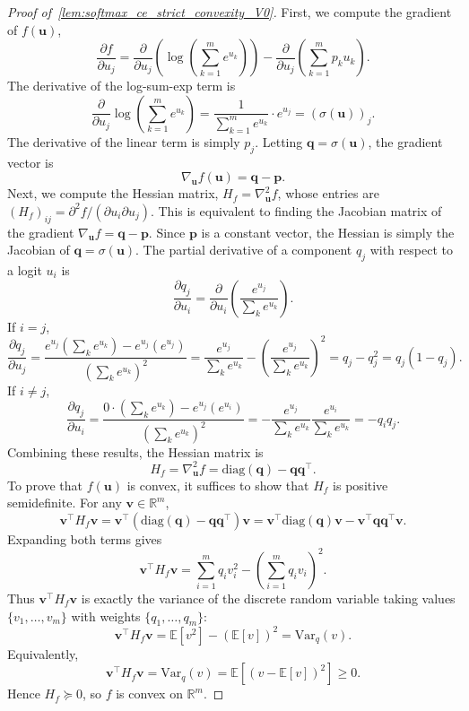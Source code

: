 \documentclass[11pt]{article}
\begin{document}
\begin{proof}[Proof of~\cref{lem:softmax_ce_strict_convexity_V0}]
First, we compute the gradient of \(f(\boldsymbol{u})\),
\[ \frac{\partial f}{\partial u_j} = \frac{\partial}{\partial u_j} \left( \log\left(\sum_{k=1}^m e^{u_k}\right) \right) - \frac{\partial}{\partial u_j} \left( \sum_{k=1}^m p_k u_k \right). \]
The derivative of the log-sum-exp term is
\[ \frac{\partial}{\partial u_j} \log\left(\sum_{k=1}^m e^{u_k}\right) = \frac{1}{\sum_{k=1}^m e^{u_k}} \cdot e^{u_j} = (\sigma(\boldsymbol{u}))_j. \]
The derivative of the linear term is simply \(p_j\).
Letting \(\boldsymbol{q} = \sigma(\boldsymbol{u})\), the gradient vector is
\[ \nabla_{\boldsymbol{u}} f(\boldsymbol{u}) = \boldsymbol{q} - \boldsymbol{p}. \]
Next, we compute the Hessian matrix, \(H_f = \nabla^2_{\boldsymbol{u}} f\), whose entries are \( (H_f)_{ij} = \partial^2 f/(\partial u_i \partial u_j) \). This is equivalent to finding the Jacobian matrix of the gradient \(\nabla_{\boldsymbol{u}} f = \boldsymbol{q} - \boldsymbol{p}\). Since \(\boldsymbol{p}\) is a constant vector, the Hessian is simply the Jacobian of \(\boldsymbol{q} = \sigma(\boldsymbol{u})\).
The partial derivative of a component \(q_j\) with respect to a logit \(u_i\) is
\[ \frac{\partial q_j}{\partial u_i} = \frac{\partial}{\partial u_i}\left( \frac{e^{u_j}}{\sum_k e^{u_k}} \right). \]
If \(i = j\),
    \[ \frac{\partial q_j}{\partial u_j} = \frac{e^{u_j}\left(\sum_k e^{u_k}\right) - e^{u_j}(e^{u_j})}{\left(\sum_k e^{u_k}\right)^2} = \frac{e^{u_j}}{\sum_k e^{u_k}} - \left(\frac{e^{u_j}}{\sum_k e^{u_k}}\right)^2 = q_j - q_j^2 = q_j(1-q_j). \]
If \(i \neq j\),
    \[ \frac{\partial q_j}{\partial u_i} = \frac{0 \cdot (\sum_k e^{u_k}) - e^{u_j}(e^{u_i})}{\left(\sum_k e^{u_k}\right)^2} = -\frac{e^{u_j}}{\sum_k e^{u_k}}\frac{e^{u_i}}{\sum_k e^{u_k}} = -q_i q_j. \]
Combining these results, the Hessian matrix is
\[ H_f = \nabla^2_{\boldsymbol{u}} f = \mathrm{diag}(\boldsymbol{q}) - \boldsymbol{q}\boldsymbol{q}^\top. \]
To prove that \(f(\boldsymbol{u})\) is convex, it suffices to show that \(H_f\) is positive semidefinite. For any \(\boldsymbol{v} \in \mathbb{R}^m\),
\[
\boldsymbol{v}^\top H_f \boldsymbol{v} = \boldsymbol{v}^\top (\mathrm{diag}(\boldsymbol{q}) - \boldsymbol{q}\boldsymbol{q}^\top) \boldsymbol{v} = \boldsymbol{v}^\top \mathrm{diag}(\boldsymbol{q}) \boldsymbol{v} - \boldsymbol{v}^\top \boldsymbol{q}\boldsymbol{q}^\top \boldsymbol{v}.
\]
Expanding both terms gives
\[
\boldsymbol{v}^\top H_f \boldsymbol{v} = \sum_{i=1}^m q_i v_i^2 - \left(\sum_{i=1}^m q_i v_i\right)^2.
\]
Thus \(\boldsymbol{v}^\top H_f \boldsymbol{v}\) is exactly the variance of the discrete random variable taking values \(\{v_1,\dots,v_m\}\) with weights \(\{q_1,\dots,q_m\}\):
\[
\boldsymbol{v}^\top H_f \boldsymbol{v} = \mathbb{E}[v^2] - (\mathbb{E}[v])^2 = \mathrm{Var}_q(v).
\]
Equivalently,
\[
\boldsymbol{v}^\top H_f \boldsymbol{v} = \mathrm{Var}_q(v) = \mathbb{E} \left[(v-\mathbb{E}[v])^2\right] \ge 0.
\]
Hence \(H_f \succeq 0\), so \(f\) is convex on \(\mathbb{R}^m\).


\end{proof}
\end{document}
